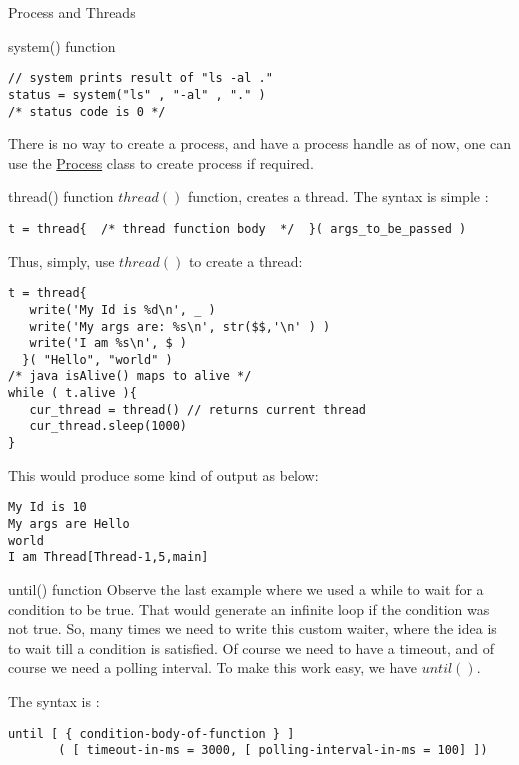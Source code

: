 \begin{section}{Process and Threads}
\begin{subsection}{system() function}
\begin{lstlisting}[style=JexlStyle]
// system prints result of "ls -al ."
status = system("ls" , "-al" , "." ) 
/* status code is 0 */
\end{lstlisting}

There is no way to create a process, and have a process handle
as of now, one can use the \href{https://docs.oracle.com/javase/8/docs/api/java/lang/Process.html}{Process} class
to create process if required.

\end{subsection}

\begin{subsection}{thread() function}
$thread()$ function, creates a thread.
The syntax is simple :
\begin{lstlisting}[style=JexlStyle]
t = thread{  /* thread function body  */  }( args_to_be_passed )
\end{lstlisting}

Thus, simply, use $thread()$ to create a thread:

\begin{lstlisting}[style=JexlStyle]
t = thread{  
   write('My Id is %d\n', _ )
   write('My args are: %s\n', str($$,'\n' ) )
   write('I am %s\n', $ )
  }( "Hello", "world" )
/* java isAlive() maps to alive */
while ( t.alive ){
   cur_thread = thread() // returns current thread 
   cur_thread.sleep(1000)
}     
\end{lstlisting}
This would produce some kind of output as below:

\begin{lstlisting}[style=all]
My Id is 10
My args are Hello
world
I am Thread[Thread-1,5,main]
\end{lstlisting}

\end{subsection}

\begin{subsection}{until() function}
Observe the last example where we used a while to wait for a condition to be true.
That would generate an infinite loop if the condition was not true.
So, many times we need to write this custom waiter, where the idea is to wait till a condition is satisfied. 
Of course we need to have a timeout, and of course we need a polling interval. 
To make this work easy, we have $until()$. 

The syntax is :

\begin{lstlisting}[style=JexlStyle]
until [ { condition-body-of-function } ]
       ( [ timeout-in-ms = 3000, [ polling-interval-in-ms = 100] ]) 
\end{lstlisting}       


\end{subsection}
\end{section}
